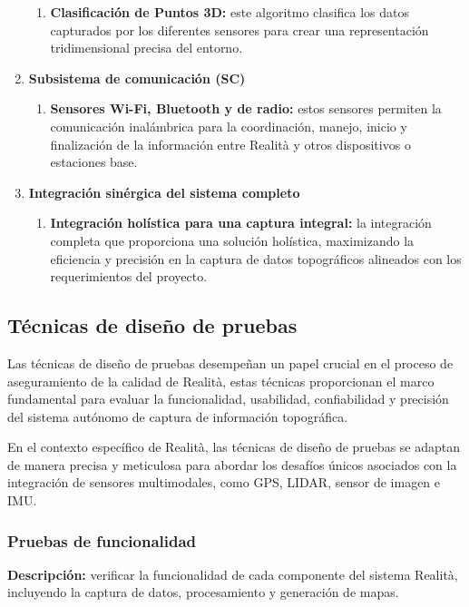 \documentclass[12pt,a4paper, twoside]{article} %
\begin{document}
\begin{enumerate}
\begin{enumerate}
\item \textbf{Clasificación de Puntos 3D:} este algoritmo clasifica los datos capturados por los diferentes sensores para crear una representación tridimensional precisa del entorno.
\end{enumerate}

\item \textbf{Subsistema de comunicación (SC)}
\begin{enumerate}
\item \textbf{Sensores Wi-Fi, Bluetooth y de radio:} estos sensores permiten la comunicación inalámbrica para la coordinación, manejo, inicio y finalización de la información entre Realità y otros dispositivos o estaciones base.
\end{enumerate}

\item \textbf{Integración sinérgica del sistema completo}
\begin{enumerate}
\item \textbf{Integración holística para una captura integral:} la integración completa que proporciona una solución holística, maximizando la eficiencia y precisión en la captura de datos topográficos alineados con los requerimientos del proyecto.
\end{enumerate}

\end{enumerate}


\subsection{Técnicas de diseño de pruebas}

Las técnicas de diseño de pruebas desempeñan un papel crucial en el proceso de aseguramiento de la calidad de Realità, estas técnicas proporcionan el marco fundamental para evaluar la funcionalidad, usabilidad, confiabilidad y precisión del sistema autónomo de captura de información topográfica.

En el contexto específico de Realità, las técnicas de diseño de pruebas se adaptan de manera precisa y meticulosa para abordar los desafíos únicos asociados con la integración de sensores multimodales, como GPS, LIDAR, sensor de imagen e IMU.

\subsubsection{Pruebas de funcionalidad}

\textbf{Descripción:} verificar la funcionalidad de cada componente del sistema Realità, incluyendo la captura de datos, procesamiento y generación de mapas.
\end{document}
